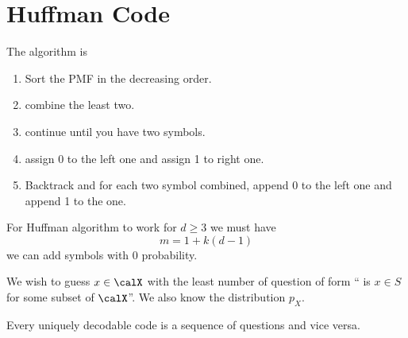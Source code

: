 \section{Huffman Code}
The algorithm is 
\begin{enumerate}
    \item Sort the PMF in the decreasing order.
    \item combine the least two.
    \item continue until you have two symbols.
    \item assign 0 to the left one and assign 1 to right one.
    \item Backtrack and for each two symbol combined, append 0 to the left one and append 1 to the one. 
\end{enumerate}
For Huffman algorithm to work for  \(d \geq 3\) we must have 
\begin{equation*}
    m =  1 + k (d- 1)
\end{equation*}
we can add symbols with 0 probability. 

\begin{example}
    We wish to guess \(x \in \calX\) with the least number of question of form `` is \(x \in S\) for some subset of \(\calX\)''. We also know the distribution \(p_X\). 
    \begin{lemma}
        Every uniquely decodable code is a sequence of questions and vice versa.
    \end{lemma}
\end{example}
